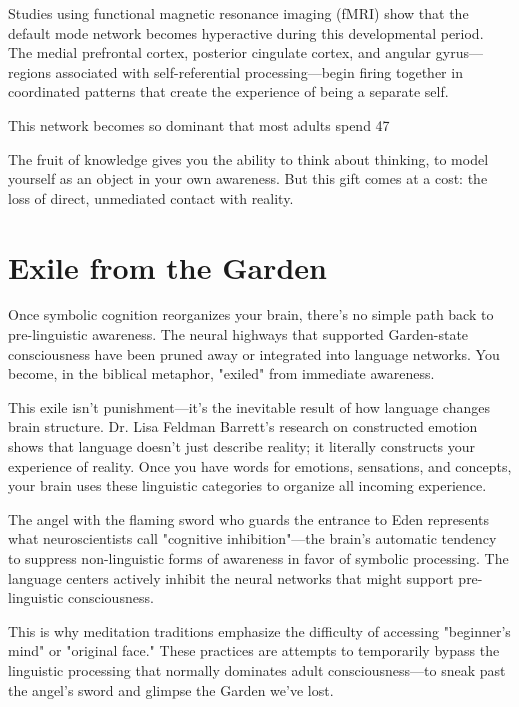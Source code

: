 \documentclass[10pt,twocolumn]{article}
\begin{document}
Studies using functional magnetic resonance imaging (fMRI) show that the default mode network becomes hyperactive during this developmental period. The medial prefrontal cortex, posterior cingulate cortex, and angular gyrus—regions associated with self-referential processing—begin firing together in coordinated patterns that create the experience of being a separate self.

This network becomes so dominant that most adults spend 47%

The fruit of knowledge gives you the ability to think about thinking, to model yourself as an object in your own awareness. But this gift comes at a cost: the loss of direct, unmediated contact with reality.

\section{Exile from the Garden}

Once symbolic cognition reorganizes your brain, there's no simple path back to pre-linguistic awareness. The neural highways that supported Garden-state consciousness have been pruned away or integrated into language networks. You become, in the biblical metaphor, "exiled" from immediate awareness.

This exile isn't punishment—it's the inevitable result of how language changes brain structure. Dr. Lisa Feldman Barrett's research on constructed emotion shows that language doesn't just describe reality; it literally constructs your experience of reality. Once you have words for emotions, sensations, and concepts, your brain uses these linguistic categories to organize all incoming experience.

The angel with the flaming sword who guards the entrance to Eden represents what neuroscientists call "cognitive inhibition"—the brain's automatic tendency to suppress non-linguistic forms of awareness in favor of symbolic processing. The language centers actively inhibit the neural networks that might support pre-linguistic consciousness.

This is why meditation traditions emphasize the difficulty of accessing "beginner's mind" or "original face." These practices are attempts to temporarily bypass the linguistic processing that normally dominates adult consciousness—to sneak past the angel's sword and glimpse the Garden we've lost.
\end{document}
